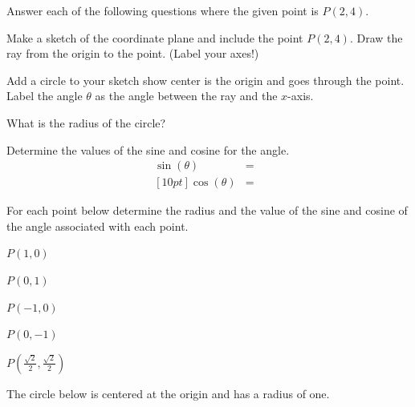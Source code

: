 \begin{problem}
\item Answer each of the following questions where the given point is $P(2,4)$.
  \begin{subproblem}
  \item Make a sketch of the coordinate plane and include the point
    $P(2,4)$. Draw the ray from the origin to the point. (Label your
    axes!)  \vfill
  \item Add a circle to your sketch show center is the origin and goes
    through the point. Label the angle $\theta$ as the angle between
    the ray and the $x$-axis.
  \item What is the radius of the circle?  
    \vspace{2em}
  \item Determine the values of the sine and cosine for the angle.
    \begin{eqnarray*}
      \sin(\theta) & = & \\ [10pt]
      \cos(\theta) & = & 
    \end{eqnarray*}
  \end{subproblem}

\clearpage

\item For each point below determine the radius and the value of the
  sine and cosine of the angle associated with each point.
  \begin{subproblem}
  \item $P(1,0)$
    \vfill
  \item $P(0,1)$
    \vfill
  \item $P(-1,0)$
    \vfill
  \item $P(0,-1)$
    \vfill
  \item $P\left(\frac{\sqrt{2}}{2},\frac{\sqrt{2}}{2}\right)$
    \vfill
  \end{subproblem}

\clearpage

\item The circle below is centered at the origin and has a radius of
  one.


\end{problem}
